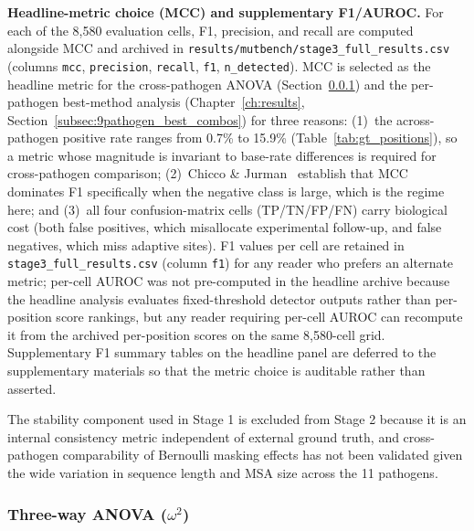 \textbf{Headline-metric choice (MCC) and supplementary F1/AUROC.}\label{subsubsec:headline_metric_choice} For each of the 8{,}580 evaluation cells, F1, precision, and recall are computed alongside MCC and archived in \texttt{results/mutbench/stage3\_full\_results.csv} (columns \texttt{mcc}, \texttt{precision}, \texttt{recall}, \texttt{f1}, \texttt{n\_detected}). MCC is selected as the headline metric for the cross-pathogen ANOVA (Section~\ref{subsec:9pathogen_statistics}) and the per-pathogen best-method analysis (Chapter~\ref{ch:results}, Section~\ref{subsec:9pathogen_best_combos}) for three reasons: (1)~the across-pathogen positive rate ranges from 0.7\% to 15.9\% (Table~\ref{tab:gt_positions}), so a metric whose magnitude is invariant to base-rate differences is required for cross-pathogen comparison; (2)~Chicco \& Jurman~\cite{chicco2020mcc} establish that MCC dominates F1 specifically when the negative class is large, which is the regime here; and (3)~all four confusion-matrix cells (TP/TN/FP/FN) carry biological cost (both false positives, which misallocate experimental follow-up, and false negatives, which miss adaptive sites). F1 values per cell are retained in \texttt{stage3\_full\_results.csv} (column \texttt{f1}) for any reader who prefers an alternate metric; per-cell AUROC was not pre-computed in the headline archive because the headline analysis evaluates fixed-threshold detector outputs rather than per-position score rankings, but any reader requiring per-cell AUROC can recompute it from the archived per-position scores on the same 8{,}580-cell grid. Supplementary F1 summary tables on the headline panel are deferred to the supplementary materials so that the metric choice is auditable rather than asserted.

The stability component used in Stage 1 is excluded from Stage 2 because it is an internal consistency metric independent of external ground truth, and cross-pathogen comparability of Bernoulli masking effects has not been validated given the wide variation in sequence length and MSA size across the 11 pathogens.

\subsubsection{Three-way ANOVA ($\omega^2$)}
\label{subsec:9pathogen_statistics}

